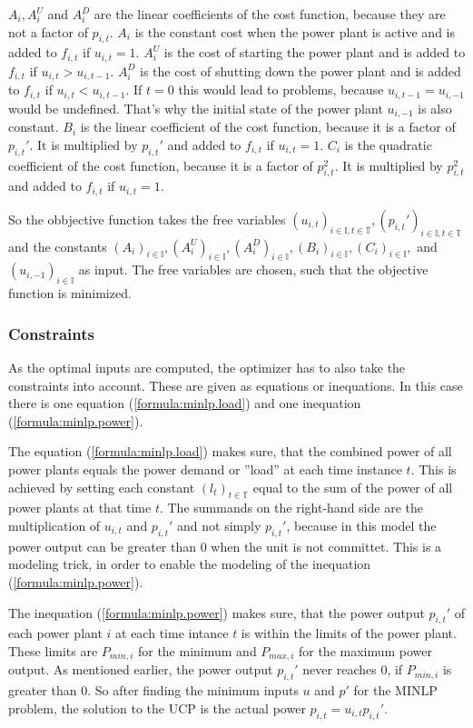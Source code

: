 $A_i, A_i^U$ and $A_i^D$ are the linear coefficients of the cost function,
because they are not a factor of $p_{i, t}$.
$A_i$ is the constant cost when the power plant is active
and is added to $f_{i, t}$ if $u_{i, t} = 1$.
$A_i^U$ is the cost of starting the power plant
and is added to $f_{i, t}$ if $u_{i, t} > u_{i, t-1}$.
$A_i^D$ is the cost of shutting down the power plant
and is added to $f_{i, t}$ if $u_{i, t} < u_{i, t-1}$.
If $t = 0$ this would lead to problems, because $u_{i, t-1} = u_{i, -1}$ would be undefined.
That's why the initial state of the power plant $u_{i, -1}$ is also constant.
$B_i$ is the linear coefficient of the cost function,
because it is a factor of $p_{i, t}'$.
It is multiplied by $p_{i, t}'$ and added to $f_{i, t}$ if $u_{i,  t} = 1$.
$C_i$ is the quadratic coefficient of the cost function,
because it is a factor of $p_{i, t}^2$.
It is multiplied by $p_{i, t}^2$ and added to $f_{i, t}$ if $u_{i,  t} = 1$.

So the obbjective function takes the free variables
$
(u_{i, t})_{i \in \mathbb{I}, t \in \mathbb{T}},
(p_{i, t}')_{i \in \mathbb{I}, t \in \mathbb{T}}
$ and the constants $
(A_i)_{i \in \mathbb{I}},
(A_i^U)_{i \in \mathbb{I}},
(A_i^D)_{i \in \mathbb{I}},
(B_i)_{i \in \mathbb{I}},
(C_i)_{i \in \mathbb{I}},
$ and $
(u_{i, -1})_{i \in \mathbb{I}}
$ as input.
The free variables are chosen, such that the objective function is minimized.

\subsubsection{Constraints}

As the optimal inputs are computed, the optimizer has to also take the constraints into account.
These are given as equations or inequations.
In this case there is one equation (\ref{formula:minlp.load}) and one inequation (\ref{formula:minlp.power}).

The equation (\ref{formula:minlp.load}) makes sure, that the combined power
of all power plants equals the power demand or ''load'' at each time instance $t$.
This is achieved by setting each constant $(l_t)_{t \in \mathbb{T}}$
equal to the sum of the power of all power plants at that time $t$.
The summands on the right-hand side are the multiplication of
$u_{i, t}$ and $p_{i, t}'$ and not simply $p_{i, t}'$,
because in this model the power output can be greater than 0
when the unit is not committet.
This is a modeling trick, in order to enable the modeling of the inequation (\ref{formula:minlp.power}).

The inequation (\ref{formula:minlp.power}) makes sure, that the power output $p_{i, t}'$
of each power plant $i$ at each time intance $t$ is within the limits of the power plant.
These limits are $P_{min, i}$ for the minimum and $P_{max, i}$ for the maximum
power output.
As mentioned earlier, the power output $p_{i, t}'$ never reaches 0,
if $P_{min, i}$ is greater than 0.
So after finding the minimum inputs $u$ and $p'$ for the MINLP problem,
the solution to the UCP is the actual power $p_{i, t} = u_{i, t} p_{i, t}'$.
